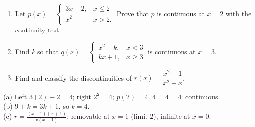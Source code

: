 \begin{exo}{}
\begin{enumerate}[label=(\alph*)]
\item Let $p(x)=\begin{cases}3x-2, & x\le2\\ x^2, & x>2.\end{cases}$ Prove that $p$ is continuous at $x=2$ with the continuity test.
\item Find $k$ so that $q(x)=\begin{cases}x^2+k, & x<3\\ kx+1, & x\ge3\end{cases}$ is continuous at $x=3$.
\item Find and classify the discontinuities of $r(x)=\dfrac{x^2-1}{x^2-x}$.
\end{enumerate}
\work{5cm}
\begin{solution}
(a) Left $3(2)-2=4$; right $2^2=4$; $p(2)=4$. $4=4=4$: continuous.\\
(b) $9+k=3k+1$, so $k=4$.\\
(c) $r=\frac{(x-1)(x+1)}{x(x-1)}$: removable at $x=1$ (limit $2$), infinite at $x=0$.
\end{solution}
\end{exo}

